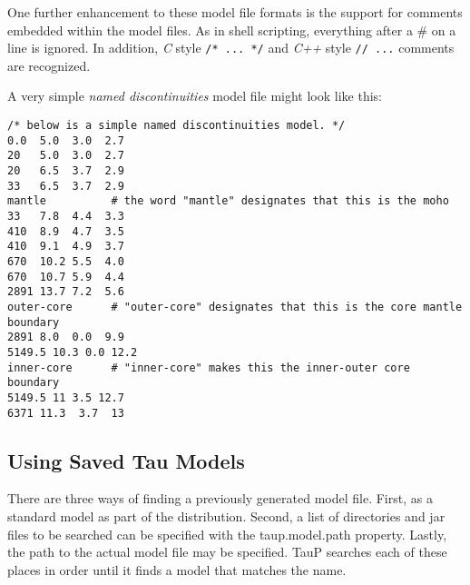 One further enhancement to these model file formats is the support for comments
embedded within the model files. As in shell scripting, everything after
a \# on a line is ignored. In addition, \textit{C} style \verb"/* ... */"
and \textit{C++} style \verb"// ..." comments are recognized.

A very simple \textit{named discontinuities} model file might look like this:
\begin{verbatim}/* below is a simple named discontinuities model. */
0.0  5.0  3.0  2.7
20   5.0  3.0  2.7
20   6.5  3.7  2.9
33   6.5  3.7  2.9
mantle          # the word "mantle" designates that this is the moho
33   7.8  4.4  3.3
410  8.9  4.7  3.5
410  9.1  4.9  3.7
670  10.2 5.5  4.0
670  10.7 5.9  4.4
2891 13.7 7.2  5.6
outer-core      # "outer-core" designates that this is the core mantle boundary
2891 8.0  0.0  9.9
5149.5 10.3 0.0 12.2
inner-core      # "inner-core" makes this the inner-outer core boundary
5149.5 11 3.5 12.7
6371 11.3  3.7  13 \end{verbatim}

\subsection{Using Saved Tau Models}
There are three ways of finding a previously generated model file. First, as
a standard model as part of the distribution. Second, a list of directories and jar files to
be searched can be specified with the taup.model.path property.
Lastly, the path to the actual model file may be specified.
TauP searches each of these
places in order until it finds a model that matches the name.

